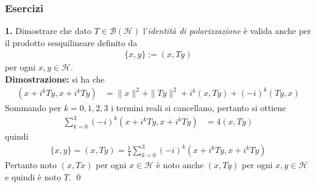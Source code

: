 \documentclass{article}
\numberwithin{equation}{subsection}
\begin{document}
\subsubsection{Esercizi}
\textbf{1.} Dimostrare che dato $T \in \mathcal{B}(\mathcal{H})$ l'\textit{identità di polarizzazione} è valida anche per il prodotto sesquilineare definito da  
\begin{align*}
    \{x, y\} := (x, Ty) 
\end{align*}
per ogni $x, y \in \mathcal{H}$. \\

\textbf{Dimostrazione:} si ha che 
\begin{align*}
    (x + i^kTy, x + i^kTy) &= \|x\|^2 + \|Ty\|^2 + i^k(x, Ty) + (-i)^k(Ty, x) 
\end{align*}
Sommando per $k = 0, 1, 2, 3$ i termini reali si cancellano, pertanto si ottiene
\begin{align*}
    \sum_{k = 0}^3 (-i)^k(x + i^kTy, x + i^kTy) &= 4(x, Ty) 
\end{align*}
quindi 
\begin{align*}
    \{x, y\} = (x, Ty) = \frac{1}{4}\sum_{k = 0}^3(-i)^k(x + i^kTy, x + i^kTy) 
\end{align*}
Pertanto noto $(x, Tx)$ per ogni $x \in \mathcal{H}$ è noto anche $(x, Ty)$ per ogni $x, y \in \mathcal{H}$ e quindi è noto $T$. \qed

\newpage
\end{document}
